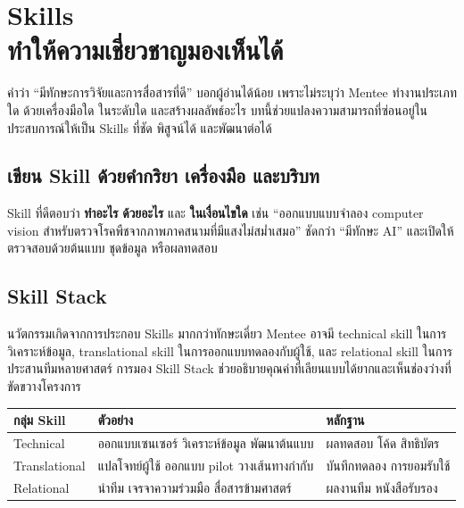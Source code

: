 \chapter{Skills\\ทำให้ความเชี่ยวชาญมองเห็นได้}

คำว่า \enquote{มีทักษะการวิจัยและการสื่อสารที่ดี} บอกผู้อ่านได้น้อย เพราะไม่ระบุว่า Mentee ทำงานประเภทใด ด้วยเครื่องมือใด ในระดับใด และสร้างผลลัพธ์อะไร บทนี้ช่วยแปลงความสามารถที่ซ่อนอยู่ในประสบการณ์ให้เป็น Skills ที่ชัด พิสูจน์ได้ และพัฒนาต่อได้


\section{เขียน Skill ด้วยคำกริยา เครื่องมือ และบริบท}
Skill ที่ดีตอบว่า \textbf{ทำอะไร} \textbf{ด้วยอะไร} และ \textbf{ในเงื่อนไขใด} เช่น \enquote{ออกแบบแบบจำลอง computer vision สำหรับตรวจโรคพืชจากภาพภาคสนามที่มีแสงไม่สม่ำเสมอ} ชัดกว่า \enquote{มีทักษะ AI} และเปิดให้ตรวจสอบด้วยต้นแบบ ชุดข้อมูล หรือผลทดสอบ

\section{Skill Stack}
นวัตกรรมเกิดจากการประกอบ Skills มากกว่าทักษะเดี่ยว Mentee อาจมี technical skill ในการวิเคราะห์ข้อมูล, translational skill ในการออกแบบทดลองกับผู้ใช้, และ relational skill ในการประสานทีมหลายศาสตร์ การมอง Skill Stack ช่วยอธิบายคุณค่าที่เลียนแบบได้ยากและเห็นช่องว่างที่ขัดขวางโครงการ

\begin{table}[ht]
\centering
\begin{tabularx}{\textwidth}{P{.23\textwidth}YY}
\toprule
\textbf{กลุ่ม Skill} & \textbf{ตัวอย่าง} & \textbf{หลักฐาน}\\
\midrule
Technical & ออกแบบเซนเซอร์ วิเคราะห์ข้อมูล พัฒนาต้นแบบ & ผลทดสอบ โค้ด สิทธิบัตร\\
Translational & แปลโจทย์ผู้ใช้ ออกแบบ pilot วางเส้นทางกำกับ & บันทึกทดลอง การยอมรับใช้\\
Relational & นำทีม เจรจาความร่วมมือ สื่อสารข้ามศาสตร์ & ผลงานทีม หนังสือรับรอง\\
\bottomrule
\end{tabularx}
\end{table}

